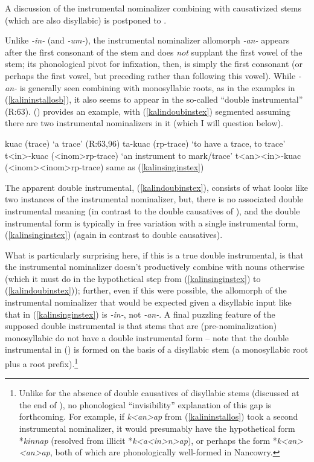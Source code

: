 \documentclass[output=paper]{langscibook}
\newcounter{nexttmp}    %
\newcounter{lasttmp}    %
\newcommand{\Next}{\setcounter{nexttmp}{\value{equation}}\stepcounter{nexttmp}(\thenexttmp)\xspace}
\newcommand{\Last}{\setcounter{lasttmp}{\value{equation}}(\thelasttmp)\xspace}
\begin{document}
\noindent A discussion of the instrumental nominalizer combining with causativized stems (which are also disyllabic) is postponed to .

Unlike \textit{-in-} (and \textit{-um-}), the instrumental nominalizer allomorph \textit{-an-} appears after the first consonant of the stem and does \textit{not} supplant the first vowel of the stem; its phonological pivot for infixation, then, is simply the first consonant (or perhaps the first vowel, but preceding rather than following this vowel). While \textit{-an-} is generally seen combining with monosyllabic roots, as in the examples in (\ref{kalininstallosb}), it also seems to appear in the so-called ``double instrumental'' (R:63). \Next provides an example, with (\ref{kalindoubinstex}) segmented assuming there are two instrumental nominalizers in it (which I will question below).%

\ea\label{kalindoubinst} 
\ea kuac (trace) \hfill `a trace' (R:63,96)
\ex ta-kuac ({\sc rp-}trace) \hfill `to have a trace, to trace'
\ex t<in>-kuac ({\sc <inom>rp-}trace)  \hfill `an instrument to mark/trace' \label{kalinsinginstex}
\ex t<an><in>-kuac ({\sc <inom><inom>rp-}trace)  \hfill same as (\ref{kalinsinginstex}) \label{kalindoubinstex}
\z
\z

\noindent The apparent double instrumental, (\ref{kalindoubinstex}), consists of what looks like two instances of the instrumental nominalizer, but, there is no associated double instrumental meaning (in contrast to the double causatives of ), and the double instrumental form is typically in free variation with a single instrumental form, (\ref{kalinsinginstex}) (again in contrast to double causatives).

What is particularly surprising here, if this is a true double instrumental, is that the instrumental nominalizer doesn't productively combine with nouns otherwise (which it must do in the hypothetical step from (\ref{kalinsinginstex}) to (\ref{kalindoubinstex})); further, even if this were possible, the allomorph of the instrumental nominalizer that would be expected given a disyllabic input like that in (\ref{kalinsinginstex}) is \textit{-in-}, not \textit{-an-}. A final puzzling feature of the supposed double instrumental is that stems that are (pre-nominalization) monosyllabic do not have a double instrumental form -- note that the double instrumental in \Last is formed on the basis of a disyllabic stem (a monosyllabic root plus a root prefix).\footnote{Unlike for the absence of double causatives of disyllabic stems (discussed at the end of ), no phonological ``invisibility'' explanation of this gap is forthcoming. For example, if \textit{k<an>ap} from (\ref{kalininstallos}) took a second instrumental nominalizer, it would presumably have the hypothetical form *\textit{kinnap} (resolved from illicit *\textit{k<a<in>n>ap}), or perhaps the form *\textit{k<an><an>ap}, both of which are  phonologically well-formed in Nancowry.}
\end{document}
